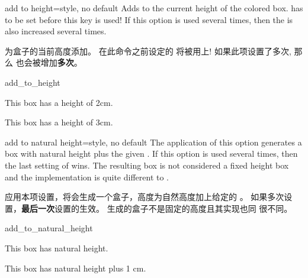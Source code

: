 \begin{docTcbKey}[][doc new=2014-11-07]{add to height}{=}{style, no default}
Adds  to the current height of the colored box.
 has to be set before this key is used!
If this option is used several times, then the  is
also increased several times.

为盒子的当前高度添加。%
在此命令之前设定的  将被用上!%
如果此项设置了多次, 那么  也会被增加{\bf 多次}。
\begin{exdispExample}{add_to_height}

\begin{tcolorbox}
This box has a height of 2cm.
\end{tcolorbox}
\begin{tcolorbox}[add to height=1cm]
This box has a height of 3cm.
\end{tcolorbox}
\end{exdispExample}
\end{docTcbKey}


\begin{docTcbKey}[][doc new=2016-02-16]{add to natural height}{=}{style, no default}
The application of this option generates a box with natural height plus
the given . If this option is used several times, then the
last setting of  wins. The resulting box is not considered
a fixed height box and the implementation is quite different to
.

应用本项设置，将会生成一个盒子，高度为自然高度加上给定的 。
如果多次设置，{\bf 最后一次}设置的生效。 生成的盒子不是固定的高度且其实现也同  很不同。
\begin{exdispExample}{add_to_natural_height}

\begin{tcolorbox}
This box has natural height.
\end{tcolorbox}
\begin{tcolorbox}[add to natural height=1cm]
This box has natural height plus 1 cm.
\end{tcolorbox}
\end{exdispExample}
\end{docTcbKey}



